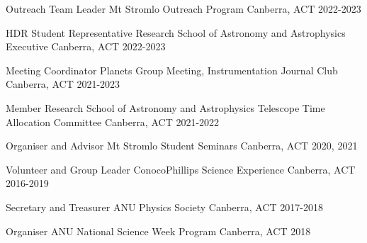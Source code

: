 

\begin{cvhonors}

    
     \cvhonor
    {Outreach Team Leader} %
    {Mt Stromlo Outreach Program} %
    {Canberra, ACT} %
    {2022-2023} %
   
   \cvhonor
    {HDR Student Representative} %
    {Research School of Astronomy and Astrophysics Executive} %
    {Canberra, ACT} %
    {2022-2023} %
   
     \cvhonor
    {Meeting Coordinator} %
    {Planets Group Meeting, Instrumentation Journal Club} %
    {Canberra, ACT} %
    {2021-2023} %
    
    \cvhonor
    {Member} %
    {Research School of Astronomy and Astrophysics Telescope Time Allocation Committee} %
    {Canberra, ACT} %
    {2021-2022} %
 
  \cvhonor
    {Organiser and Advisor} %
    {Mt Stromlo Student Seminars} %
    {Canberra, ACT} %
    {2020, 2021} %

  \cvhonor
    {Volunteer and Group Leader} %
    {ConocoPhillips Science Experience} %
    {Canberra, ACT} %
    {2016-2019} %

  \cvhonor
    {Secretary and Treasurer} %
    {ANU Physics Society} %
    {Canberra, ACT} %
    {2017-2018} %
    
  \cvhonor
    {Organiser} %
    {ANU National Science Week Program} %
    {Canberra, ACT} %
    {2018} %


    

\end{cvhonors}
